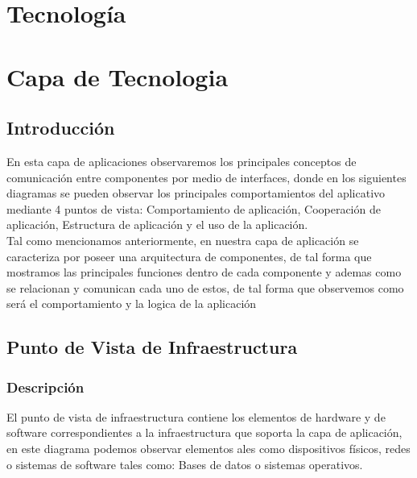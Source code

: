 \chapter{Tecnología}

\chapter{Capa de Tecnologia}

\section{Introducción}
En esta capa de aplicaciones observaremos los principales conceptos de comunicación entre componentes por medio de interfaces, donde en los siguientes diagramas se pueden observar los principales comportamientos del aplicativo mediante 4 puntos de vista: Comportamiento de aplicación, Cooperación de aplicación, Estructura de aplicación y el uso de la aplicación.\\
Tal como mencionamos anteriormente, en nuestra capa de aplicación se caracteriza por poseer una arquitectura de componentes, de tal forma que  mostramos las principales funciones dentro de cada componente y ademas como se relacionan y comunican cada uno de estos, de tal forma que observemos como será el comportamiento y la logica de la aplicación

\section{Punto de Vista de Infraestructura}
\subsection{Descripción}
El punto de vista de infraestructura contiene los elementos de hardware y de software correspondientes a la infraestructura que soporta la capa de aplicación, en este diagrama podemos observar elementos ales como dispositivos físicos, redes o sistemas de software tales como: Bases de datos o sistemas operativos.

